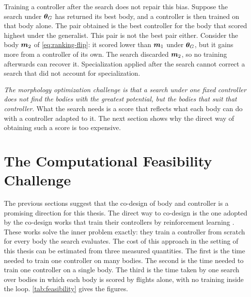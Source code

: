 Training a controller after the search does not repair this bias. Suppose the search under $\bm{\theta}_G$ has returned its best body, and a controller is then trained on that body alone. The pair obtained is the best controller for the body that scored highest under the generalist. This pair is not the best pair either. Consider the body $\bm{m}_2$ of \eqref{eq:ranking-flip}: it scored lower than $\bm{m}_1$ under $\bm{\theta}_G$, but it gains more from a controller of its own. The search discarded $\bm{m}_2$, so no training afterwards can recover it. Specialization applied after the search cannot correct a search that did not account for specialization.

\emph{The morphology optimization challenge is that a search under one fixed controller does not find the bodies with the greatest potential, but the bodies that suit that controller.} What the search needs is a score that reflects what each body can do with a controller adapted to it. The next section shows why the direct way of obtaining such a score is too expensive.

\section{The Computational Feasibility Challenge}
\label{sec:challenge-feasibility}

The previous sections suggest that the co-design of body and controller is a promising direction for this thesis. The direct way to co-design is the one adopted by the co-design works that train their controllers by reinforcement learning \cite{gupta2021embodied, muff2026hexacopters}. These works solve the inner problem exactly: they train a controller from scratch for every body the search evaluates. The cost of this approach in the setting of this thesis can be estimated from three measured quantities. The first is the time needed to train one controller on many bodies. The second is the time needed to train one controller on a single body. The third is the time taken by one search over bodies in which each body is scored by flights alone, with no training inside the loop. \autoref{tab:feasibility} gives the figures.

